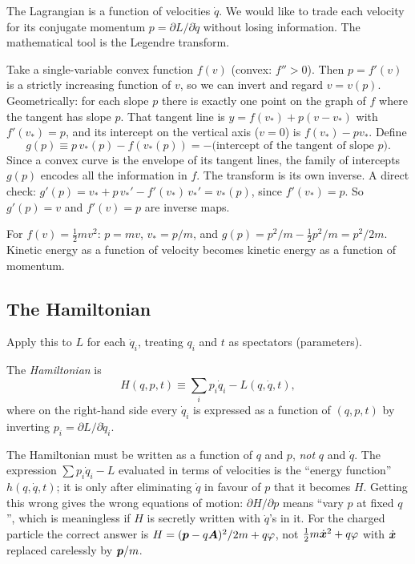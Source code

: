 \documentclass[11pt]{article}
\begin{document}
The Lagrangian is a function of velocities $\dot q$. We would like to trade each velocity for its conjugate momentum $p=\partial L/\partial\dot q$ without losing information. The mathematical tool is the Legendre transform.

Take a single-variable convex function $f(v)$ (convex: $f''>0$). Then $p=f'(v)$ is a strictly increasing function of $v$, so we can invert and regard $v=v(p)$. Geometrically: for each slope $p$ there is exactly one point on the graph of $f$ where the tangent has slope $p$. That tangent line is $y=f(v_*)+p(v-v_*)$ with $f'(v_*)=p$, and its intercept on the vertical axis ($v=0$) is $f(v_*)-pv_*$. Define
\begin{equation}
 g(p) \equiv p\,v_*(p) - f(v_*(p)) = -\bigl(\text{intercept of the tangent of slope }p\bigr).
\end{equation}
Since a convex curve is the envelope of its tangent lines, the family of intercepts $g(p)$ encodes all the information in $f$. The transform is its own inverse. A direct check: $g'(p)=v_*+p\,v_*'-f'(v_*)\,v_*'=v_*(p)$, since $f'(v_*)=p$. So $g'(p)=v$ and $f'(v)=p$ are inverse maps.

\begin{example}
For $f(v)=\tfrac12mv^2$: $p=mv$, $v_*=p/m$, and $g(p)=p^2/m-\tfrac12 p^2/m=p^2/2m$. Kinetic energy as a function of velocity becomes kinetic energy as a function of momentum.
\end{example}

\subsection{The Hamiltonian}

Apply this to $L$ for each $\dot q_i$, treating $q_i$ and $t$ as spectators (parameters).

\begin{definition}
The \emph{Hamiltonian} is
\begin{equation}
 H(q,p,t)\equiv \sum_i p_i\dot q_i - L(q,\dot q,t),
\label{eq:Hdef}
\end{equation}
where on the right-hand side every $\dot q_i$ is expressed as a function of $(q,p,t)$ by inverting $p_i=\partial L/\partial\dot q_i$.
\end{definition}

\begin{pitfall}
The Hamiltonian must be written as a function of $q$ and $p$, \emph{not} $q$ and $\dot q$. The expression $\sum p_i\dot q_i-L$ evaluated in terms of velocities is the ``energy function'' $h(q,\dot q,t)$; it is only after eliminating $\dot q$ in favour of $p$ that it becomes $H$. Getting this wrong gives the wrong equations of motion: $\partial H/\partial p$ means ``vary $p$ at fixed $q$'', which is meaningless if $H$ is secretly written with $\dot q$'s in it. For the charged particle the correct answer is $H=(\bm{p}-q\bm{A})^2/2m+q\varphi$, not $\tfrac12m\dot{\bm{x}}^2+q\varphi$ with $\dot{\bm{x}}$ replaced carelessly by $\bm{p}/m$.
\end{pitfall}
\end{document}

